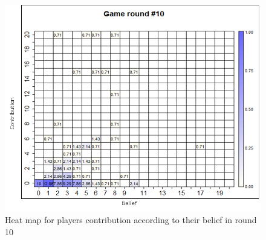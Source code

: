 \begin{figure}[!h]
	\centering
	\includegraphics[scale=0.35]{images/chapter3/HeatMapContribution10.png}
	\caption{Heat map for players contribution according to their belief in round 10}
	\label{fig:contribution3}
\end{figure}

